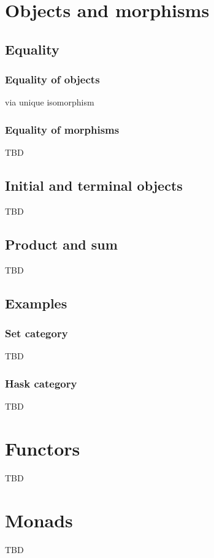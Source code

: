 \chapter{Objects and morphisms}

\section{Equality}

\subsection{Equality of objects}
via unique isomorphism

\subsection{Equality of morphisms}
TBD

\section{Initial and terminal objects}
TBD

\section{Product and sum}
TBD

\section{Examples}

\subsection{\textbf{Set} category}
TBD

\subsection{\textbf{Hask} category}
TBD


\chapter{Functors}

TBD

\chapter{Monads}

TBD
